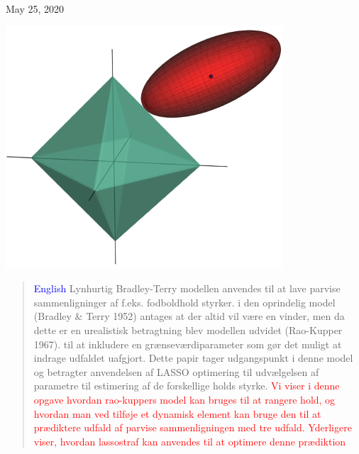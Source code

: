 \documentclass[11pt,a4paper]{article}
\renewcommand*\contentsname{Table of Contents}
\begin{document}
\begin{titlepage}
	
	
	\vfill\vfill\vfill %
	
	{\large{May 25, 2020}} %
	
	
	\includegraphics[width=0.7 \textwidth]{GLR2.png}\\[1cm] %
	 
	
	\vfill %
	
\end{titlepage}
\begin{abstract}
\textcolor{blue}{English} Lynhurtig Bradley-Terry modellen anvendes til at lave parvise sammenligninger af f.eks. fodboldhold styrker. i den oprindelig model (Bradley \& Terry 1952) antages at der altid vil være en vinder, men da dette er en urealistisk betragtning blev modellen udvidet (Rao-Kupper 1967). til at inkludere en grænseværdiparameter som gør det muligt at indrage udfaldet uafgjort. Dette papir tager udgangspunkt i denne model og betragter anvendelsen af LASSO optimering til udvælgelsen af parametre til estimering af de forskellige holds styrke. \textcolor{red}{Vi viser i denne opgave hvordan rao-kuppers model kan bruges til at rangere hold, og hvordan man ved tilføje et dynamisk element kan bruge den til at prædiktere udfald af parvise sammenligningen med tre udfald. Yderligere viser, hvordan lassostraf kan anvendes til at optimere denne prædiktion}
\end{abstract}
\clearpage
\renewcommand{\contentsname}{Indholdsfortegnelse}
\clearpage
\tableofcontents
\clearpage
\newpage
{}
\end{document}
